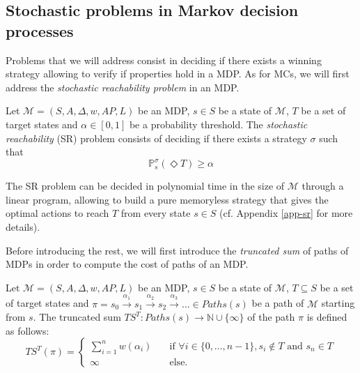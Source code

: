 \subsection{Stochastic problems in Markov decision processes}
Problems that we will address consist in deciding if there exists a winning strategy allowing to verify if properties hold in a MDP.
As for MCs, we will first address the \textit{stochastic reachability problem} in an MDP.
\begin{definition}
  Let $\mathcal{M}=(S, A, \Delta, w, AP, L)$ be an MDP, $s \in S$ be a state of $\mathcal{M}$, $T$ be a set of target states and $\alpha \in [0, 1]$ be
  a probability threshold. The \textit{stochastic reachability} (SR) problem consists
  of deciding if there exists a strategy $\sigma$ such that
  \[
    \mathbb{P}_s^\sigma(\Diamond T) \geq \alpha
  \]
\end{definition}

\begin{theorem}\label{thm-sr}
  The SR problem can be decided in polynomial time in the size of $\mathcal{M}$
  through a linear program, allowing to build a pure memoryless strategy that gives the optimal actions to reach $T$ from every state $s \in S$ (cf. Appendix \ref{app-sr} for more details).
\end{theorem}

Before introducing the rest, we will first introduce the \textit{truncated sum} of paths of MDPs in order to compute the cost of paths of an MDP.

\begin{definition}
	Let $\mathcal{M} = (S, A, \Delta, w, AP, L)$ be an MDP, $s \in S$ be a state of $\mathcal{M}$, $T \subseteq S$ be a set of target states and
	$\pi = s_0 \xrightarrow{\alpha_1} s_1 \xrightarrow{\alpha_2} s_2 \xrightarrow{\alpha_3} \dots \in Paths(s)$ be a path of
	$\mathcal{M}$ starting from $s$. The truncated sum $TS^T: Paths(s)
	\rightarrow \mathbb{N} \cup \{\infty\}$ of the path $\pi$ is defined as follows:
	\[
		TS^T(\pi) =
		\begin{cases}
			\sum_{i = 1}^{n} w(\alpha_i) & \quad \text{if } \forall i \in \{0, \dots, n - 1\}, s_i \notin T \text{ and } s_n \in T \\
			\infty & \quad \text{else.}
		\end{cases}
	\]

\end{definition}

